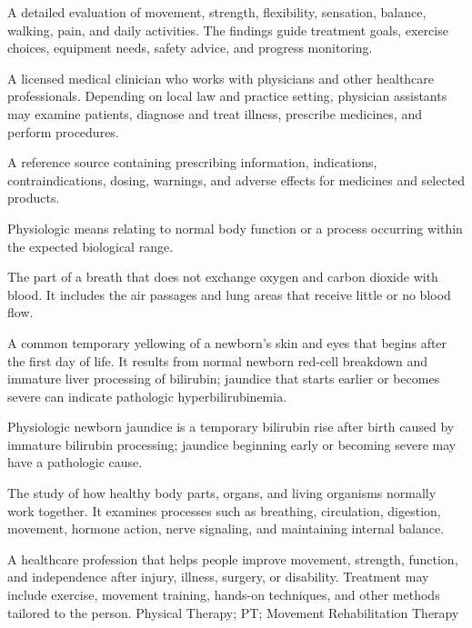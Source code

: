  A detailed evaluation of movement, strength, flexibility, sensation, balance, walking, pain, and daily activities. The findings guide treatment goals, exercise choices, equipment needs, safety advice, and progress monitoring.

 A licensed medical clinician who works with physicians and other healthcare professionals. Depending on local law and practice setting, physician assistants may examine patients, diagnose and treat illness, prescribe medicines, and perform procedures.

 A reference source containing prescribing information, indications, contraindications, dosing, warnings, and adverse effects for medicines and selected products.

 Physiologic means relating to normal body function or a process occurring within the expected biological range.

 The part of a breath that does not exchange oxygen and carbon dioxide with blood. It includes the air passages and lung areas that receive little or no blood flow.

 A common temporary yellowing of a newborn’s skin and eyes that begins after the first day of life. It results from normal newborn red-cell breakdown and immature liver processing of bilirubin; jaundice that starts earlier or becomes severe can indicate pathologic hyperbilirubinemia.

 Physiologic newborn jaundice is a temporary bilirubin rise after birth caused by immature bilirubin processing; jaundice beginning early or becoming severe may have a pathologic cause.

 The study of how healthy body parts, organs, and living organisms normally work together. It examines processes such as breathing, circulation, digestion, movement, hormone action, nerve signaling, and maintaining internal balance.

 A healthcare profession that helps people improve movement, strength, function, and independence after injury, illness, surgery, or disability. Treatment may include exercise, movement training, hands-on techniques, and other methods tailored to the person.
\synonyms
Physical Therapy; PT; Movement Rehabilitation Therapy


